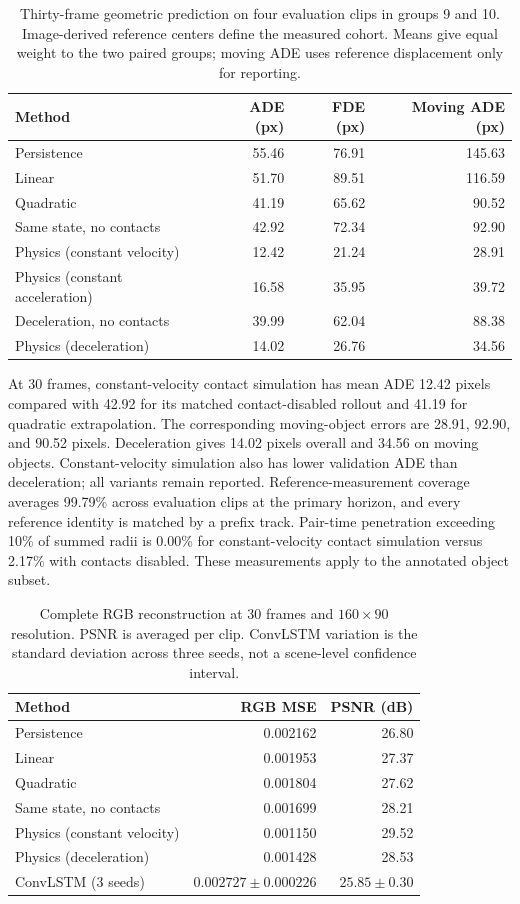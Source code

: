 \begin{table}[htbp]
\caption{Thirty-frame geometric prediction on four evaluation clips in groups 9 and 10. Image-derived reference centers define the measured cohort. Means give equal weight to the two paired groups; moving ADE uses reference displacement only for reporting.}
\label{tab:geometry}
\centering
\begin{tabular}{lrrr}
\toprule
Method & ADE (px) & FDE (px) & Moving ADE (px) \\
\midrule
Persistence & 55.46 & 76.91 & 145.63 \\
Linear & 51.70 & 89.51 & 116.59 \\
Quadratic & 41.19 & 65.62 & 90.52 \\
Same state, no contacts & 42.92 & 72.34 & 92.90 \\
Physics (constant velocity) & 12.42 & 21.24 & 28.91 \\
Physics (constant acceleration) & 16.58 & 35.95 & 39.72 \\
Deceleration, no contacts & 39.99 & 62.04 & 88.38 \\
Physics (deceleration) & 14.02 & 26.76 & 34.56 \\
\bottomrule
\end{tabular}
\end{table}

At 30 frames, constant-velocity contact simulation has mean ADE 12.42 pixels compared with 42.92 for its matched contact-disabled rollout and 41.19 for quadratic extrapolation. The corresponding moving-object errors are 28.91, 92.90, and 90.52 pixels. Deceleration gives 14.02 pixels overall and 34.56 on moving objects. Constant-velocity simulation also has lower validation ADE than deceleration; all variants remain reported.
Reference-measurement coverage averages 99.79\% across evaluation clips at the primary horizon, and every reference identity is matched by a prefix track. Pair-time penetration exceeding 10\% of summed radii is 0.00\% for constant-velocity contact simulation versus 2.17\% with contacts disabled. These measurements apply to the annotated object subset.

\begin{table}[htbp]
\caption{Complete RGB reconstruction at 30 frames and $160\times90$ resolution. PSNR is averaged per clip. ConvLSTM variation is the standard deviation across three seeds, not a scene-level confidence interval.}
\label{tab:rgb}
\centering
\begin{tabular}{lrr}
\toprule
Method & RGB MSE & PSNR (dB) \\
\midrule
Persistence & 0.002162 & 26.80 \\
Linear & 0.001953 & 27.37 \\
Quadratic & 0.001804 & 27.62 \\
Same state, no contacts & 0.001699 & 28.21 \\
Physics (constant velocity) & 0.001150 & 29.52 \\
Physics (deceleration) & 0.001428 & 28.53 \\
ConvLSTM (3 seeds) & $0.002727 \pm 0.000226$ & $25.85 \pm 0.30$ \\
\bottomrule
\end{tabular}
\end{table}

